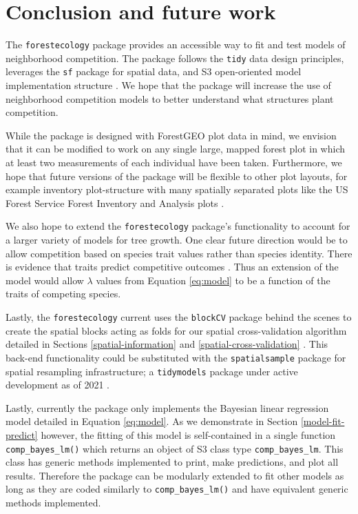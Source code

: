 \documentclass[12pt]{article}
\begin{document}
\hypertarget{conclusion-and-future-work}{%
\section{Conclusion and future work}\label{conclusion-and-future-work}}

The \texttt{forestecology} package provides an accessible way to fit and
test models of neighborhood competition. The package follows the
\texttt{tidy} data design principles, leverages the \texttt{sf} package
for spatial data, and S3 open-oriented model implementation structure
\citep{pebesma_simple_2018}. We hope that the package will increase the
use of neighborhood competition models to better understand what
structures plant competition.

While the package is designed with ForestGEO plot data in mind, we
envision that it can be modified to work on any single large, mapped
forest plot in which at least two measurements of each individual have
been taken. Furthermore, we hope that future versions of the package
will be flexible to other plot layouts, for example inventory
plot-structure with many spatially separated plots like the US Forest
Service Forest Inventory and Analysis plots \citep{smith_forest_2002}.

We also hope to extend the \texttt{forestecology} package's
functionality to account for a larger variety of models for tree growth.
One clear future direction would be to allow competition based on
species trait values rather than species identity. There is evidence
that traits predict competitive outcomes
\citep[\citet{lasky_trait-mediated_2014},
\citet{uriarte_trait_2010}]{kunstler_competitive_2012}. Thus an
extension of the model would allow \(\lambda\) values from Equation
\ref{eq:model} to be a function of the traits of competing species.

Lastly, the \texttt{forestecology} current uses the \texttt{blockCV}
package behind the scenes to create the spatial blocks acting as folds
for our spatial cross-validation algorithm detailed in Sections
\ref{spatial-information} and \ref{spatial-cross-validation}
\citep{valavi_blockcv_2019}. This back-end functionality could be
substituted with the \texttt{spatialsample} package for spatial
resampling infrastructure; a \texttt{tidymodels} package under active
development as of 2021
\citep[\citet{tidymodels_package}]{spatialsample_package}.

Lastly, currently the package only implements the Bayesian linear
regression model detailed in Equation \ref{eq:model}. As we demonstrate
in Section \ref{model-fit-predict} however, the fitting of this model is
self-contained in a single function \texttt{comp\_bayes\_lm()} which
returns an object of S3 class type \texttt{comp\_bayes\_lm}. This class
has generic methods implemented to print, make predictions, and plot all
results. Therefore the package can be modularly extended to fit other
models as long as they are coded similarly to \texttt{comp\_bayes\_lm()}
and have equivalent generic methods implemented.
\end{document}
